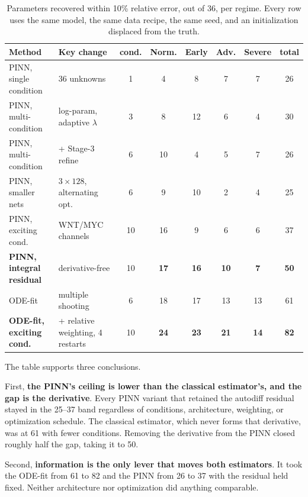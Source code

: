 \documentclass[11pt]{article}
\begin{document}
\begin{table}[H]
\centering
\small
\setlength{\tabcolsep}{3pt}
\begin{tabular}{lL{4.3cm}cccccc}
\toprule
\textbf{Method} & \textbf{Key change} & \textbf{cond.} &
\textbf{Norm.} & \textbf{Early} & \textbf{Adv.} & \textbf{Severe} &
\textbf{total} \\
\midrule
PINN, single condition & 36 unknowns             & 1  & 4  & 8  & 7  & 7  & 26 \\
PINN, multi-condition  & log-param, adaptive $\lambda$ & 3  & 8  & 12 & 6  & 4  & 30 \\
PINN, multi-condition  & + Stage-3 refine        & 6  & 10 & 4  & 5  & 7  & 26 \\
PINN, smaller nets     & $3\times128$, alternating opt. & 6 & 9 & 10 & 2 & 4 & 25 \\
PINN, exciting cond.   & WNT/MYC channels        & 10 & 16 & 9  & 6  & 6  & 37 \\
\textbf{PINN, integral residual} & derivative-free & 10 & \textbf{17} & \textbf{16} & \textbf{10} & \textbf{7} & \textbf{50} \\
\midrule
ODE-fit                & multiple shooting       & 6  & 18 & 17 & 13 & 13 & 61 \\
\textbf{ODE-fit, exciting cond.} & + relative weighting, 4 restarts & 10 & \textbf{24} & \textbf{23} & \textbf{21} & \textbf{14} & \textbf{82} \\
\bottomrule
\end{tabular}
\caption{Parameters recovered within 10\% relative error, out of 36, per
regime. Every row uses the same model, the same data recipe, the same seed, and
an initialization displaced from the truth.}
\label{tab:inverse}
\end{table}

The table supports three conclusions.

First, \textbf{the PINN's ceiling is lower than the classical estimator's, and
the gap is the derivative}. Every PINN variant that retained the
autodiff residual stayed in the 25--37 band regardless of conditions,
architecture, weighting, or optimization schedule. The classical estimator,
which never forms that derivative, was at 61 with fewer conditions. Removing
the derivative from the PINN closed roughly half the gap, taking it to 50.

Second, \textbf{information is the only lever that moves both estimators}. It
took the ODE-fit from 61 to 82 and the PINN from 26 to 37 with the residual
held fixed. Neither architecture nor optimization did anything comparable.
\end{document}
